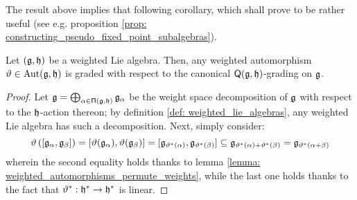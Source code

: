         The result above implies that following corollary, which shall prove to be rather useful (see e.g. proposition \ref{prop: constructing_pseudo_fixed_point_subalgebras}).
        \begin{corollary} \label{coro: weighted_automorphisms_are_graded}
            Let $(\mathfrak{g}, \mathfrak{h})$ be a weighted Lie algebra. Then, any weighted automorphism $\vartheta \in \operatorname{Aut}(\mathfrak{g}, \mathfrak{h})$ is graded with respect to the canonical $\mathsf{Q}(\mathfrak{g}, \mathfrak{h})$-grading on $\mathfrak{g}$.
        \end{corollary}
            \begin{proof}
                Let $\mathfrak{g} = \bigoplus_{\alpha \in \mathsf{\Pi}(\mathfrak{g}, \mathfrak{h})} \mathfrak{g}_{\alpha}$ be the weight space decomposition of $\mathfrak{g}$ with respect to the $\mathfrak{h}$-action thereon; by definition \ref{def: weighted_lie_algebras}, any weighted Lie algebra has such a decomposition. Next, simply consider:
                    $$\vartheta\left( [\mathfrak{g}_{\alpha}, \mathfrak{g}_{\beta}] \right) = [\vartheta(\mathfrak{g}_{\alpha}), \vartheta(\mathfrak{g}_{\beta})] = [\mathfrak{g}_{\vartheta^*(\alpha)}, \mathfrak{g}_{\vartheta^*(\beta)}] \subseteq \mathfrak{g}_{\vartheta^*(\alpha) + \vartheta^*(\beta)} = \mathfrak{g}_{\vartheta^*(\alpha + \beta)}$$
                wherein the second equality holds thanks to lemma \ref{lemma: weighted_automorphisms_permute_weights}, while the last one holds thanks to the fact that $\vartheta^*: \mathfrak{h}^* \to \mathfrak{h}^*$ is linear.
            \end{proof}

